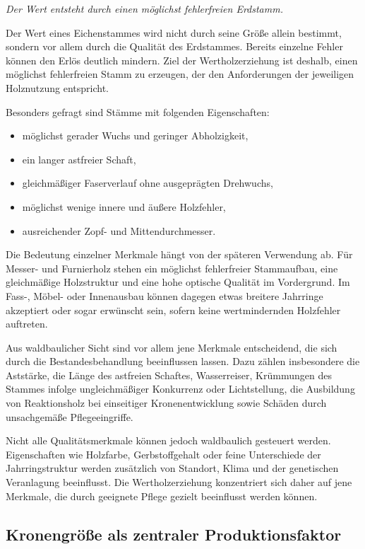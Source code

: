 \documentclass[twocolumn, bibliography=totoc, abstract=true]{scrartcl}
\begin{document}
\emph{Der Wert entsteht durch einen möglichst fehlerfreien Erdstamm.}

Der Wert eines Eichenstammes wird nicht durch seine Größe allein bestimmt, sondern vor allem durch die Qualität des Erdstammes. Bereits einzelne Fehler können den Erlös deutlich mindern. Ziel der Wertholzerziehung ist deshalb, einen möglichst fehlerfreien Stamm zu erzeugen, der den Anforderungen der jeweiligen Holznutzung entspricht.

Besonders gefragt sind Stämme mit folgenden Eigenschaften:

\begin{itemize}
\item möglichst gerader Wuchs und geringer Abholzigkeit,
\item ein langer astfreier Schaft,
\item gleichmäßiger Faserverlauf ohne ausgeprägten Drehwuchs,
\item möglichst wenige innere und äußere Holzfehler,
\item ausreichender Zopf- und Mittendurchmesser.
\end{itemize}

Die Bedeutung einzelner Merkmale hängt von der späteren Verwendung ab. Für Messer- und Furnierholz stehen ein möglichst fehlerfreier Stammaufbau, eine gleichmäßige Holzstruktur und eine hohe optische Qualität im Vordergrund. Im Fass-, Möbel- oder Innenausbau können dagegen etwas breitere Jahrringe akzeptiert oder sogar erwünscht sein, sofern keine wertmindernden Holzfehler auftreten.

Aus waldbaulicher Sicht sind vor allem jene Merkmale entscheidend, die sich durch die Bestandesbehandlung beeinflussen lassen. Dazu zählen insbesondere die Aststärke, die Länge des astfreien Schaftes, Wasserreiser, Krümmungen des Stammes infolge ungleichmäßiger Konkurrenz oder Lichtstellung, die Ausbildung von Reaktionsholz bei einseitiger Kronenentwicklung sowie Schäden durch unsachgemäße Pflegeeingriffe.

Nicht alle Qualitätsmerkmale können jedoch waldbaulich gesteuert werden. Eigenschaften wie Holzfarbe, Gerbstoffgehalt oder feine Unterschiede der Jahrringstruktur werden zusätzlich von Standort, Klima und der genetischen Veranlagung beeinflusst. Die Wertholzerziehung konzentriert sich daher auf jene Merkmale, die durch geeignete Pflege gezielt beeinflusst werden können.

\subsection{Kronengröße als zentraler Produktionsfaktor}
\end{document}
